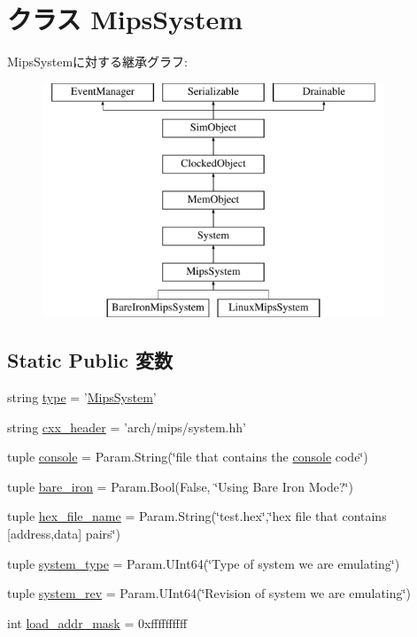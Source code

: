 \hypertarget{classMipsSystem_1_1MipsSystem}{
\section{クラス MipsSystem}
\label{classMipsSystem_1_1MipsSystem}
}
MipsSystemに対する継承グラフ:\begin{figure}[H]
\begin{center}
\leavevmode
\includegraphics[height=7cm]{classMipsSystem_1_1MipsSystem}
\end{center}
\end{figure}
\subsection*{Static Public 変数}
\begin{DoxyCompactItemize}
\item 
string \hyperlink{classMipsSystem_1_1MipsSystem_acce15679d830831b0bbe8ebc2a60b2ca}{type} = '\hyperlink{classMipsSystem_1_1MipsSystem}{MipsSystem}'
\item 
string \hyperlink{classMipsSystem_1_1MipsSystem_a17da7064bc5c518791f0c891eff05fda}{cxx\_\-header} = 'arch/mips/system.hh'
\item 
tuple \hyperlink{classMipsSystem_1_1MipsSystem_adaeebf25942c40e39b43056608af1c51}{console} = Param.String(\char`\"{}file that contains the \hyperlink{classMipsSystem_ac1fd76adeba49aea2ab70e0cba58d9d0}{console} code\char`\"{})
\item 
tuple \hyperlink{classMipsSystem_1_1MipsSystem_a6e15ba3272e38d8deffaf29ebfd4bf58}{bare\_\-iron} = Param.Bool(False, \char`\"{}Using Bare Iron Mode?\char`\"{})
\item 
tuple \hyperlink{classMipsSystem_1_1MipsSystem_a646616e47eba70e20cb5c35443d7bf4a}{hex\_\-file\_\-name} = Param.String(\char`\"{}test.hex\char`\"{},\char`\"{}hex file that contains \mbox{[}address,data\mbox{]} pairs\char`\"{})
\item 
tuple \hyperlink{classMipsSystem_1_1MipsSystem_af401252d15d9cecde29d1fdcbaba250d}{system\_\-type} = Param.UInt64(\char`\"{}Type of system we are emulating\char`\"{})
\item 
tuple \hyperlink{classMipsSystem_1_1MipsSystem_a0f86e3835b8bf2135faf7b1bab968494}{system\_\-rev} = Param.UInt64(\char`\"{}Revision of system we are emulating\char`\"{})
\item 
int \hyperlink{classMipsSystem_1_1MipsSystem_abd9c5cc6b7da624a69344d571bab1038}{load\_\-addr\_\-mask} = 0xffffffffff
\end{DoxyCompactItemize}


